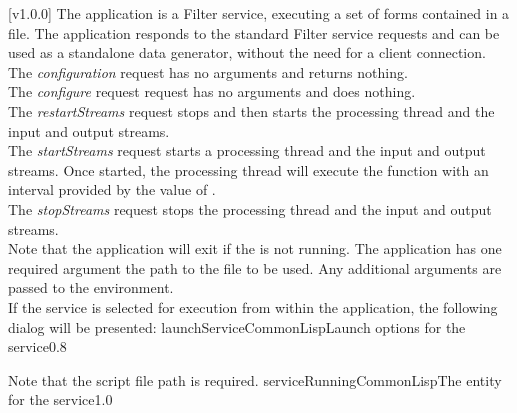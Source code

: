[v1.0.0]
The  application is a Filter service, executing a set
of \CL{} forms contained in a file.
The application responds to the standard Filter service requests and can be used as a
standalone data generator, without the need for a client connection.\\

The \emph{configuration} request has no arguments and returns nothing.\\

The \emph{configure} request request has no arguments and does nothing.\\

The \emph{restartStreams} request stops and then starts the processing thread and the
input and output streams.\\

The \emph{startStreams} request starts a processing thread and the input and output
streams.
Once started, the processing thread will execute the  function with
an interval provided by the value of .\\

The \emph{stopStreams} request stops the processing thread and the input and output
streams.\\ 

Note that the application will exit if the \emph{\RS} is not running.
The application has one required argument \longDash{} the path to the \CL{} file to be
used.
Any additional arguments are passed to the \CL{} environment.
\insertAppParameters
\insertTagDescription{\CLF}
\insertFilterServiceComment\\

\insertStandardServiceCommands
\secondaryEnd
\condPage
{}
If the service is selected for execution from within the \emph{\MMMU} application, the
following dialog will be presented:
%
{launchServiceCommonLisp}{Launch options for the \emph{\CLF} service}{0.8}

Note that the script file path is required.
%
{serviceRunningCommonLisp}{The \emph{\MMMU} entity for the \emph{\CLF} service}{1.0}

